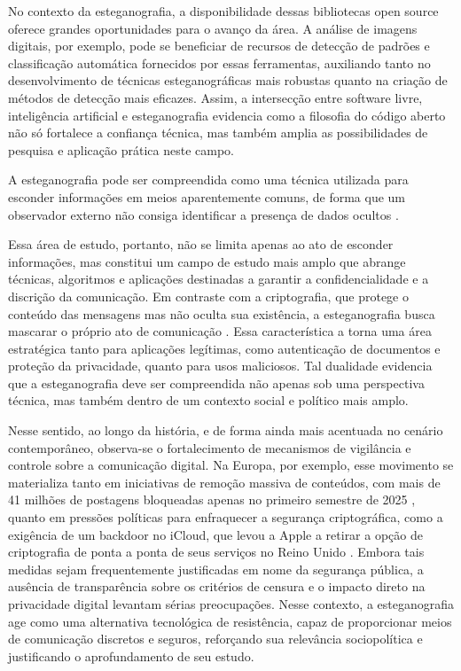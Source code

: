 \documentclass[12pt]{article}
\begin{document}
No contexto da esteganografia, a disponibilidade dessas bibliotecas open source
oferece grandes oportunidades para o avanço da área. A análise de imagens
digitais, por exemplo, pode se beneficiar de recursos de detecção de padrões e
classificação automática fornecidos por essas ferramentas, auxiliando tanto no
desenvolvimento de técnicas esteganográficas mais robustas quanto na criação de
métodos de detecção mais eficazes. Assim, a intersecção entre software livre,
inteligência artificial e esteganografia evidencia como a filosofia do código
aberto não só fortalece a confiança técnica, mas também amplia as
possibilidades de pesquisa e aplicação prática neste campo.

A esteganografia pode ser compreendida como uma técnica utilizada para esconder
informações em meios aparentemente comuns, de forma que um observador externo
não consiga identificar a presença de dados ocultos \cite{Fridrich2010}.

Essa área de estudo, portanto, não se limita apenas ao ato de esconder
informações, mas constitui um campo de estudo mais amplo que abrange técnicas,
algoritmos e aplicações destinadas a garantir a confidencialidade e a discrição
da comunicação. Em contraste com a criptografia, que protege o conteúdo das
mensagens mas não oculta sua existência, a esteganografia busca mascarar o
próprio ato de comunicação \cite{Fridrich2010}. Essa característica a torna uma
área estratégica tanto para aplicações legítimas, como autenticação de
documentos e proteção da privacidade, quanto para usos maliciosos. Tal
dualidade evidencia que a esteganografia deve ser compreendida não apenas sob
uma perspectiva técnica, mas também dentro de um contexto social e político
mais amplo.

Nesse sentido, ao longo da história, e de forma ainda mais acentuada no cenário
contemporâneo, observa-se o fortalecimento de mecanismos de vigilância e
controle sobre a comunicação digital. Na Europa, por exemplo, esse movimento se
materializa tanto em iniciativas de remoção massiva de conteúdos, com mais de
41 milhões de postagens bloqueadas apenas no primeiro semestre de 2025
\cite{poder3602025}, quanto em pressões políticas para enfraquecer a segurança
criptográfica, como a exigência de um backdoor no iCloud, que levou a Apple a
retirar a opção de criptografia de ponta a ponta de seus serviços no Reino
Unido \cite{guardian2025}. Embora tais medidas sejam frequentemente
justificadas em nome da segurança pública, a ausência de transparência sobre os
critérios de censura e o impacto direto na privacidade digital levantam sérias
preocupações. Nesse contexto, a esteganografia age como uma alternativa
tecnológica de resistência, capaz de proporcionar meios de comunicação
discretos e seguros, reforçando sua relevância sociopolítica e justificando o
aprofundamento de seu estudo.
\end{document}
